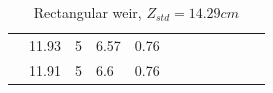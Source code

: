 {\begin{table}[ht]
\begin{tabular}{cllllccccccc}
		& 11.93                    & 5                           & 6.57                    & 0.76                          &                        &                       &                         &                           &                           &                                     &                                \\
		& 11.91                    & 5                           & 6.6                     & 0.76                          &                        &                       &                         &                           &                           &                                     &                                \\ \bottomrule
	\end{tabular}
	\hspace{-2cm}
	\caption{Rectangular weir, $Z_{std}=14.29cm$}
\end{table}}

